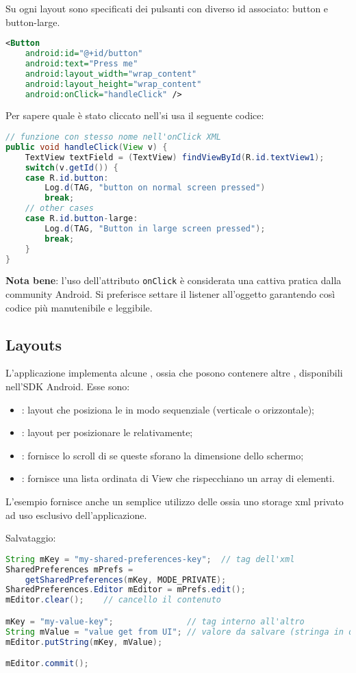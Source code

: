 Su ogni layout sono specificati dei pulsanti con diverso id associato: button e button-large.
\begin{lstlisting}[language=XML]
<Button
    android:id="@+id/button"
    android:text="Press me"
    android:layout_width="wrap_content"
    android:layout_height="wrap_content"
    android:onClick="handleClick" />
\end{lstlisting}

Per sapere quale è stato cliccato nell'\Activity si usa il seguente codice:

\begin{lstlisting}[language=Java]
// funzione con stesso nome nell'onClick XML
public void handleClick(View v) {
	TextView textField = (TextView) findViewById(R.id.textView1);
	switch(v.getId()) {
	case R.id.button: 
		Log.d(TAG, "button on normal screen pressed")
		break;
	// other cases
	case R.id.button-large: 
		Log.d(TAG, "Button in large screen pressed");
		break;
	}
}
\end{lstlisting}

\textbf{Nota bene}: l'uso dell'attributo \texttt{onClick} è considerata una cattiva pratica dalla community Android. Si preferisce settare il listener all'oggetto garantendo così codice più manutenibile e leggibile.

\subsection{Layouts}
L'applicazione implementa alcune \ViewGroup, ossia \View che posono contenere altre \View, disponibili nell'SDK Android. Esse sono:
\begin{itemize}
	\item \LinearLayout: layout che posiziona le \View in modo sequenziale (verticale o orizzontale);
	\item \RelativeLayout: layout per posizionare le \View relativamente;
	\item \ScrollView: fornisce lo scroll di \View se queste sforano la dimensione dello schermo;
	\item \ListView: fornisce una lista ordinata di View che rispecchiano un array di elementi.
\end{itemize}

L'esempio fornisce anche un semplice utilizzo delle \SharedPreferences ossia uno storage xml privato ad uso esclusivo dell'applicazione.

Salvataggio:
\begin{lstlisting}[language=Java]
String mKey = "my-shared-preferences-key";	// tag dell'xml
SharedPreferences mPrefs = 
	getSharedPreferences(mKey, MODE_PRIVATE);
SharedPreferences.Editor mEditor = mPrefs.edit();
mEditor.clear();	// cancello il contenuto

mKey = "my-value-key";				 // tag interno all'altro
String mValue = "value get from UI"; // valore da salvare (stringa in questo caso)
mEditor.putString(mKey, mValue);

mEditor.commit();
\end{lstlisting}


